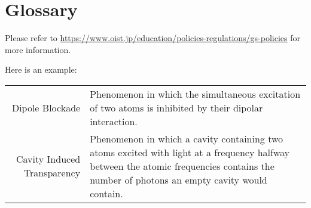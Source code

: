 \chapter*{Glossary}

Please refer to \url{https://www.oist.jp/education/policies-regulations/gs-policies} for more information.

Here is an example:

\begin{center}
    \begin{longtable}{r p{}}
        Dipole Blockade             & Phenomenon in which the simultaneous excitation of two atoms is inhibited by their dipolar interaction.                                                                                  \\
        Cavity Induced Transparency & Phenomenon in which a cavity containing two atoms excited with light at a frequency halfway between the atomic frequencies contains the number of photons an empty cavity would contain. \\
    \end{longtable}
\end{center}
